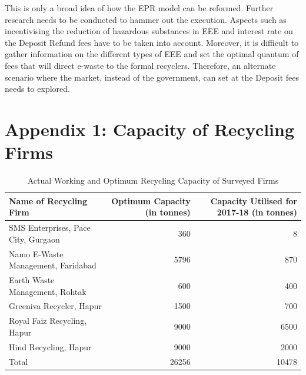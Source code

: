 \documentclass[a4paper, 12pt]{article}
\begin{document}
                    This is only a broad idea of how the EPR model can be reformed. Further research needs to be conducted to hammer out the execution. Aspects such as incentivising the reduction of hazardous substances in EEE and interest rate on the Deposit Refund fees have to be taken into account. Moreover, it is difficult to gather information on the different types of EEE and set the optimal quantum of fees that will direct e-waste to the formal recyclers. Therefore, an alternate scenario where the market, instead of the government, can set at the Deposit fees needs to explored. \\
         

	\printbibliography[title={Bibliography}]
         
         
             \section*{Appendix 1: Capacity of Recycling Firms}
        \begin{table}[htbp]
          \centering
          \caption{Actual Working and Optimum Recycling Capacity of Surveyed Firms}
            \begin{tabular}{lrr}
            \multicolumn{1}{p{5em}}{Name of Recycling Firm} & \multicolumn{1}{p{5em}}{Optimum Capacity (in tonnes)} & \multicolumn{1}{p{7.915em}}{Capacity Utilised for 2017-18 (in tonnes)} \\
            \midrule
            SMS Enterprises, Pace City, Gurgaon & 360   & 8 \\
            Namo E-Waste Management, Faridabad & 5796  & 870 \\
            Earth Waste Management, Rohtak & 600   & 400 \\
            Greeniva Recycler, Hapur & 1500  & 700 \\
            Royal Faiz Recycling, Hapur  & 9000  & 6500 \\
            Hind Recycling, Hapur & 9000  & 2000 \\
            \midrule
            Total & 26256 & 10478 \\
            \end{tabular}%
          \label{tab:addlabel}%
        \end{table}%
        
\end{document}
